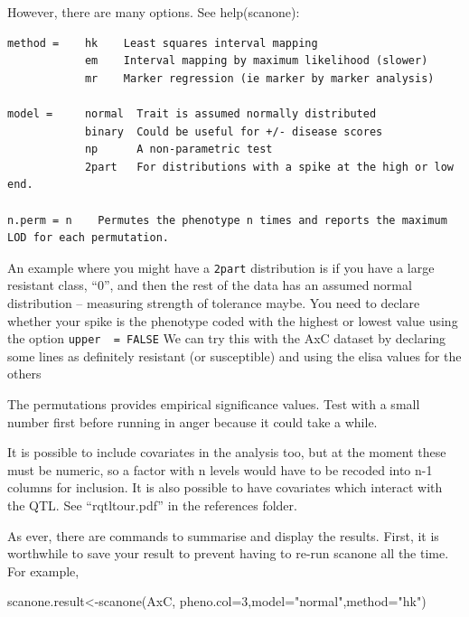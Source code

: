 \documentclass[
]{book}
\newenvironment{Shaded}{\begin{snugshade}}{\end{snugshade}}
\newcommand{\AttributeTok}[1]{\textcolor[rgb]{0.77,0.63,0.00}{#1}}
\newcommand{\DecValTok}[1]{\textcolor[rgb]{0.00,0.00,0.81}{#1}}
\newcommand{\FunctionTok}[1]{\textcolor[rgb]{0.00,0.00,0.00}{#1}}
\newcommand{\NormalTok}[1]{#1}
\newcommand{\OtherTok}[1]{\textcolor[rgb]{0.56,0.35,0.01}{#1}}
\newcommand{\StringTok}[1]{\textcolor[rgb]{0.31,0.60,0.02}{#1}}
\begin{document}
However, there are many options. See help(scanone):

\begin{verbatim}
method =    hk    Least squares interval mapping   
            em    Interval mapping by maximum likelihood (slower)   
            mr    Marker regression (ie marker by marker analysis) 

model =     normal  Trait is assumed normally distributed                   
            binary  Could be useful for +/- disease scores
            np      A non-parametric test 
            2part   For distributions with a spike at the high or low end.   

n.perm = n    Permutes the phenotype n times and reports the maximum LOD for each permutation. 
\end{verbatim}

An example where you might have a \texttt{2part} distribution is if you have a large resistant class, ``0'', and then the rest of the data has an assumed normal distribution -- measuring strength of tolerance maybe. You need to declare whether your spike is the phenotype coded with the highest or lowest value using the option \texttt{upper\ \ =\ FALSE} We can try this with the AxC dataset by declaring some lines as definitely resistant (or susceptible) and using the elisa values for the others

The permutations provides empirical significance values. Test with a small number first before running in anger because it could take a while.

It is possible to include covariates in the analysis too, but at the moment these must be numeric, so a factor with n levels would have to be recoded into n-1 columns for inclusion. It is also possible to have covariates which interact with the QTL. See ``rqtltour.pdf'' in the references folder.

As ever, there are commands to summarise and display the results. First, it is worthwhile to save your result to prevent having to re-run scanone all the time. For example,

\begin{Shaded}
\begin{Highlighting}[]
\NormalTok{scanone.result}\OtherTok{\textless{}{-}}\FunctionTok{scanone}\NormalTok{(AxC, }\AttributeTok{pheno.col=}\DecValTok{3}\NormalTok{,}\AttributeTok{model=}\StringTok{"normal"}\NormalTok{,}\AttributeTok{method=}\StringTok{"hk"}\NormalTok{) }
\end{Highlighting}
\end{Shaded}
\end{document}
